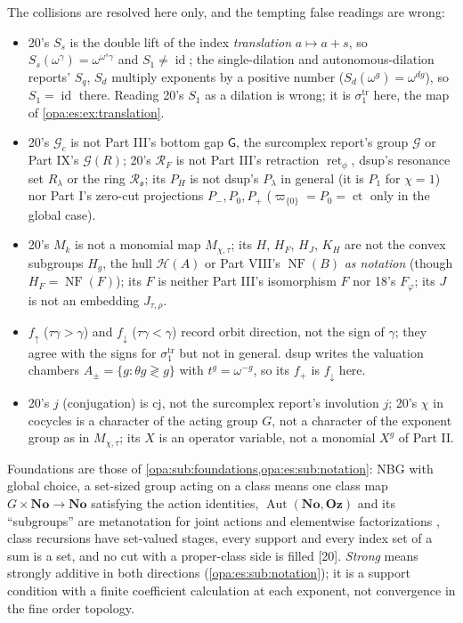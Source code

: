 \documentclass[11pt,oneside]{article}
\numberwithin{equation}{section}
\theoremstyle{definition}
\theoremstyle{remark}
\newcommand{\No}{\mathbf{No}}
\newcommand{\Oz}{\mathbf{Oz}}
\newcommand{\oo}{\mathfrak o}
\newcommand{\Ro}{\mathcal R_{\oo}}
\newcommand{\HH}{\mathcal H}
\newcommand{\Aut}{\operatorname{Aut}}
\newcommand{\ct}{\operatorname{ct}}
\newcommand{\id}{\operatorname{id}}
\newcommand{\src}[1]{\textup{\textsf{\small[#1]}}}
\newcommand{\gap}{\mathsf G}
\newcommand{\ret}{\operatorname{ret}}
\newcommand{\NF}{\operatorname{NF}}
\begin{document}
The collisions are resolved here only, and the tempting false readings are wrong:
\begin{itemize}[itemsep=1pt]
\item 20's $S_s$ is the double lift of the index \emph{translation} $a\mapsto a+s$, so $S_s(\omega^\gamma)=\omega^{\omega^s\gamma}$ and $S_1\ne\id$;
the single-dilation and autonomous-dilation reports' $S_q$, $S_d$ multiply exponents by a positive number ($S_d(\omega^g)=\omega^{dg}$), so $S_1=\id$ there. Reading 20's
$S_1$ as a dilation is wrong; it is $\sigma^{\mathrm{tr}}_1$ here, the map of \cref{opa:es:ex:translation}.
\item 20's $\mathcal G_c$ is not Part III's bottom gap $\gap$, the surcomplex report's group $\mathcal G$ or Part IX's $\mathcal G(R)$; 20's
$\mathcal R_F$ is not Part III's retraction $\ret_\phi$, dsup's resonance set $R_\lambda$ or the ring $\Ro$; its $P_H$ is not dsup's
$P_\lambda$ in general (it is $P_1$ for $\chi=1$) nor Part I's zero-cut projections $P_-,P_0,P_+$ ($\varpi_{\{0\}}=P_0=\ct$ only in the
global case).
\item 20's $M_k$ is not a monomial map $M_{\chi,\tau}$; its $H$, $H_F$, $H_J$, $K_H$ are not the convex subgroups $H_g$, the hull
$\HH(A)$ or Part VIII's $\NF(B)$ \emph{as notation} (though $H_F=\NF(F)$); its $F$ is neither Part III's isomorphism $F$ nor 18's $F_\varphi$;
its $J$ is not an embedding $J_{\tau,\rho}$.
\item $f_\uparrow$ ($\tau\gamma>\gamma$) and $f_\downarrow$ ($\tau\gamma<\gamma$) record orbit direction, not the sign of $\gamma$; they agree with
the signs for $\sigma^{\mathrm{tr}}_1$ but not in general. dsup writes the valuation chambers $A_\pm=\{g:\theta g\gtrless g\}$ with $t^g=\omega^{-g}$,
so its $f_+$ is $f_\downarrow$ here.
\item 20's $j$ (conjugation) is $\mathrm{cj}$, not the surcomplex report's involution $j$; 20's $\chi$ in cocycles is a character of the
acting group $G$, not a character of the exponent group as in $M_{\chi,\tau}$; its $X$ is an operator variable, not a monomial $X^g$ of
Part II.
\end{itemize}
Foundations are those of \cref{opa:sub:foundations,opa:es:sub:notation}: NBG with global choice, a set-sized group acting on a class
means one class map $G\times\No\to\No$ satisfying the action identities, $\Aut(\No,\Oz)$ and its ``subgroups'' are metanotation for
joint actions and elementwise factorizations \cite[Remark~2.1]{KKS}, class recursions have set-valued stages, every support and every
index set of a sum is a set, and no cut with a proper-class side is filled \src{20}. \emph{Strong} means strongly additive in both
directions (\cref{opa:es:sub:notation}); it is a support condition with a finite coefficient calculation at each exponent, not convergence
in the fine order topology.
\end{document}
